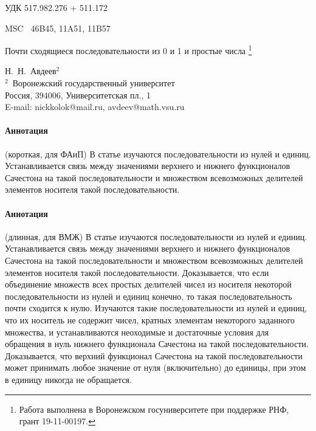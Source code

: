 \documentclass[a4paper,openbib]{article}
\theoremstyle{definition}
\begin{document}
УДК  { 517.982.276 %
     + 511.172    }%

MSC~
	46B45,
	11A51,
	11B57



\begin{center}
	Почти сходящиеся последовательности из 0 и 1 и простые числа
	\footnote{
		Работа выполнена в Воронежском госуниверситете при поддержке РНФ, грант 19-11-00197.
	}
\end{center}

\begin{center}
	{Н.~Н.~Авдеев$^{2}$\\[4pt]}
	{\rm\footnotesize{$^2$\,
	Воронежский государственный университет\\
	Россия, 394006, Университетская пл., 1\\
	E-mail: nickkolok@mail.ru, avdeev@math.vsu.ru}}
\end{center}


\paragraph{Аннотация} (короткая, для ФАиП)
В статье изучаются последовательности из нулей и единиц.
Устанавливается связь между значениями верхнего и нижнего функционалов Сачестона
на такой последовательности и множеством всевозможных делителей
элементов носителя такой последовательности.


\paragraph{Аннотация} (длинная, для ВМЖ)
В статье изучаются последовательности из нулей и единиц.
Устанавливается связь между значениями верхнего и нижнего функционалов Сачестона
на такой последовательности и множеством всевозможных делителей
элементов носителя такой последовательности.
Доказывается, что если объединение множеств всех простых делителей чисел из носителя некоторой последовательности
из нулей и единиц конечно, то такая последовательность почти сходится к нулю.
Изучаются такие последовательности из нулей и единиц,
что их носитель не содержит чисел,
кратных элементам некоторого заданного множества,
и устанавливаются неоходимые и достаточные условия для обращения в нуль нижнего функционала Сачестона
на такой последовательности.
Доказывается, что верхний функционал Сачестона на такой последовательности
может принимать любое значение от нуля (включительно) до единицы,
при этом в единицу никогда не обращается.
\end{document}
